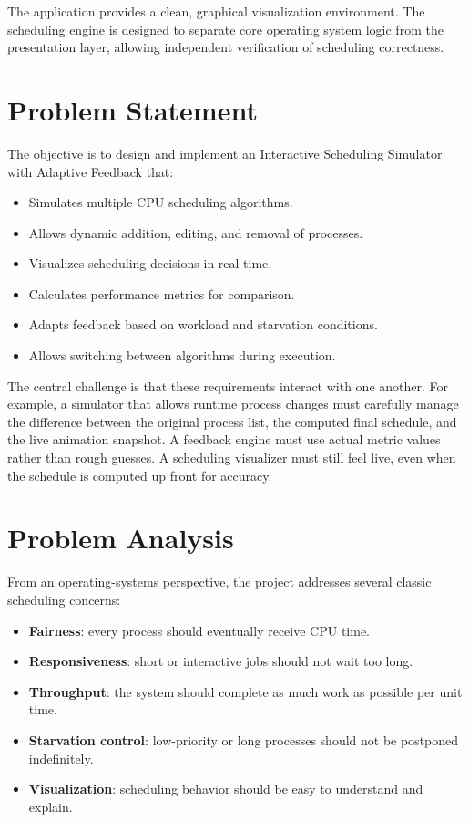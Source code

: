 \documentclass[12pt]{article}
\begin{document}
The application provides a clean, graphical visualization environment. The scheduling engine is designed to separate core operating system logic from the presentation layer, allowing independent verification of scheduling correctness.

\section{Problem Statement}
The objective is to design and implement an Interactive Scheduling Simulator with Adaptive Feedback that:
\begin{itemize}[leftmargin=*]
    \item Simulates multiple CPU scheduling algorithms.
    \item Allows dynamic addition, editing, and removal of processes.
    \item Visualizes scheduling decisions in real time.
    \item Calculates performance metrics for comparison.
    \item Adapts feedback based on workload and starvation conditions.
    \item Allows switching between algorithms during execution.
\end{itemize}

The central challenge is that these requirements interact with one another. For example, a simulator that allows runtime process changes must carefully manage the difference between the original process list, the computed final schedule, and the live animation snapshot. A feedback engine must use actual metric values rather than rough guesses. A scheduling visualizer must still feel live, even when the schedule is computed up front for accuracy.

\section{Problem Analysis}
From an operating-systems perspective, the project addresses several classic scheduling concerns:
\begin{itemize}[leftmargin=*]
    \item \textbf{Fairness}: every process should eventually receive CPU time.
    \item \textbf{Responsiveness}: short or interactive jobs should not wait too long.
    \item \textbf{Throughput}: the system should complete as much work as possible per unit time.
    \item \textbf{Starvation control}: low-priority or long processes should not be postponed indefinitely.
    \item \textbf{Visualization}: scheduling behavior should be easy to understand and explain.
\end{itemize}
\end{document}
